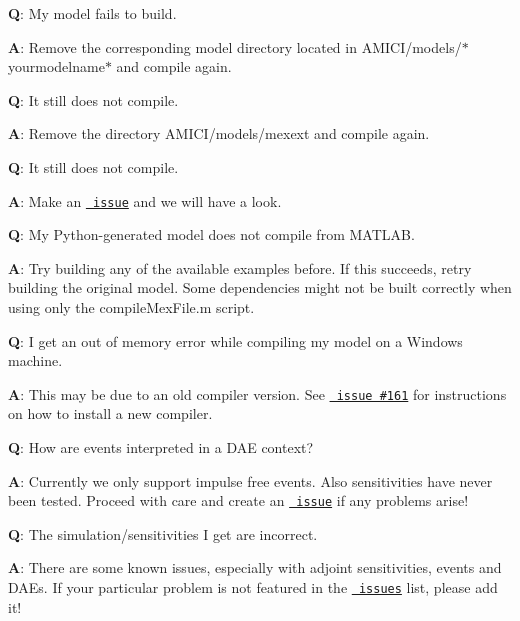{\bfseries{Q}}\+: My model fails to build.

{\bfseries{A}}\+: Remove the corresponding model directory located in A\+M\+I\+C\+I/models/$\ast$yourmodelname$\ast$ and compile again.



{\bfseries{Q}}\+: It still does not compile.

{\bfseries{A}}\+: Remove the directory A\+M\+I\+C\+I/models/{\ttfamily mexext} and compile again.



{\bfseries{Q}}\+: It still does not compile.

{\bfseries{A}}\+: Make an \href{https://github.com/ICB-DCM/AMICI/issues}{\texttt{ issue}} and we will have a look.



{\bfseries{Q}}\+: My Python-\/generated model does not compile from M\+A\+T\+L\+AB.

{\bfseries{A}}\+: Try building any of the available examples before. If this succeeds, retry building the original model. Some dependencies might not be built correctly when using only the {\ttfamily compile\+Mex\+File.\+m} script.



{\bfseries{Q}}\+: I get an out of memory error while compiling my model on a Windows machine.

{\bfseries{A}}\+: This may be due to an old compiler version. See \href{https://github.com/ICB-DCM/AMICI/issues/161}{\texttt{ issue \#161}} for instructions on how to install a new compiler.



{\bfseries{Q}}\+: How are events interpreted in a D\+AE context?

{\bfseries{A}}\+: Currently we only support impulse free events. Also sensitivities have never been tested. Proceed with care and create an \href{https://github.com/ICB-DCM/AMICI/issues}{\texttt{ issue}} if any problems arise!



{\bfseries{Q}}\+: The simulation/sensitivities I get are incorrect.

{\bfseries{A}}\+: There are some known issues, especially with adjoint sensitivities, events and D\+A\+Es. If your particular problem is not featured in the \href{https://github.com/ICB-DCM/AMICI/issues}{\texttt{ issues}} list, please add it!

